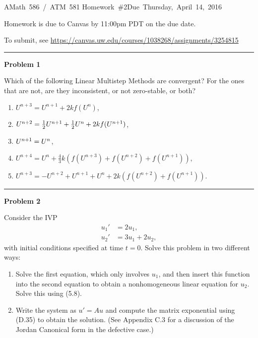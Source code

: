 \documentclass[10pt]{article}
\begin{document}
\hfill\vbox{\hbox{AMath 586 / ATM 581}
\hbox{Homework \#2}\hbox{Due Thursday, April 14, 2016}}

\vskip 5pt

Homework is due to Canvas by 11:00pm PDT on the due date.

To submit, see
\url{https://canvas.uw.edu/courses/1038268/assignments/3254815}



\vskip 1cm
\hrule
{\bf Problem 1}

Which of the following Linear Multistep Methods are convergent?  For 
the ones that are not, are they inconsistent, or not zero-stable, or both?
 \begin{enumerate}
 \item $U^{n+3} = U^{n+1} + 2kf(U^n)$,
 \item $U^{n+2} = \frac{1}{2} U^{n+1} + \frac{1}{2} U^{n} + 2kf(U^{n+1})$,
 \item $U^{n+1} = U^n$, 
 \item $U^{n+4} = U^{n} + \frac 4 3 k(f(U^{n+3})+f(U^{n+2})+f(U^{n+1}))$,
 \item $U^{n+3} = -U^{n+2} + U^{n+1} +U^{n}+2k(f(U^{n+2})+f(U^{n+1}))$.
 \end{enumerate}






\vskip 1cm
\hrule
{\bf Problem 2}


Consider the IVP
\begin{equation*}
\begin{split}
u_1' &= 2u_1,\\
u_2' &= 3u_1 + 2u_2,
\end{split}
\end{equation*}
with initial conditions specified at time $t=0$.  Solve this problem in two
different ways:

\begin{enumerate}
\item Solve the first equation, which only involves $u_1$, and then insert
this function into the second equation to obtain a nonhomogeneous linear
equation for $u_2$.  Solve this using (5.8).

\item Write the system as $u' = Au$ and compute the matrix exponential using
(D.35) to obtain the solution.  (See Appendix C.3 for a discussion of the
Jordan Canonical form in the defective case.)
\end{enumerate}
\end{document}
